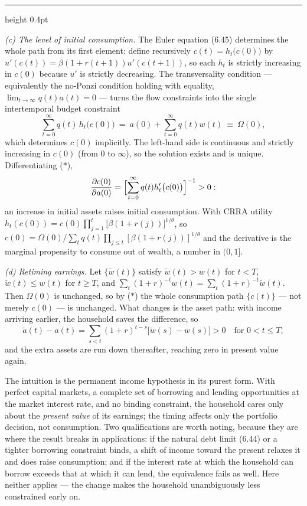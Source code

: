 \documentclass[11pt,letterpaper,reqno]{amsart}
\makeatletter
\newcommand{\as@head}[3]{%
  \par\addvspace{1.6ex}\penalty-200\relax
  \phantomsection
  \addcontentsline{toc}{subsection}{#1 #2\texorpdfstring{\ifx\relax#3\relax\else\quad #3\fi}{}}%
  {\color{RuleGrey}\hrule height 0.4pt}%
  \nobreak\vspace{0.8ex}\nobreak
  \noindent{\bfseries #1 #2}%
  \ifx\relax#3\relax\else\quad{\bfseries\itshape #3}\fi
  \par\nobreak\vspace{0.4ex}\nobreak
  \as@beginstatement
}
\newcommand{\as@beginstatement}{\begingroup\itshape\ignorespaces}
\newenvironment{aex}[2]{\as@head{Exercise}{#1}{#2}}{\par\addvspace{1.2ex}}
\newcommand{\bk}[1]{\textup{\textsc{#1}}}
\renewcommand{\as@beginstatement}{\ignorespaces}
\makeatother
\begin{document}
\begin{aex}{6.13}{}
\emph{(c) The level of initial consumption.}  The Euler equation \bk{(6.45)} determines the whole path from
its first element: define recursively $c(t)=h_t\bigl(c(0)\bigr)$ by
$u'(c(t))=\beta(1+r(t+1))u'(c(t+1))$, so each $h_t$ is strictly increasing in $c(0)$ because $u'$ is
strictly decreasing.  The transversality condition --- equivalently the no-Ponzi condition holding with
equality, $\lim_{t\to\infty}q(t)a(t)=0$ --- turns the flow constraints into the single intertemporal budget
constraint
\[
\sum_{t=0}^{\infty}q(t)\,h_t\bigl(c(0)\bigr)\ =\ a(0)+\sum_{t=0}^{\infty}q(t)w(t)\ \equiv\ \Omega(0),
\tag{$*$}
\]
which determines $c(0)$ implicitly.  The left-hand side is continuous and strictly increasing in $c(0)$
(from $0$ to $\infty$), so the solution exists and is unique.  Differentiating ($*$),
\[
\frac{\partial c(0)}{\partial a(0)}=\Bigl[\sum_{t=0}^{\infty}q(t)h_t'\bigl(c(0)\bigr)\Bigr]^{-1}>0 :
\]
an increase in initial assets raises initial consumption.  With CRRA utility
$h_t(c(0))=c(0)\prod_{j=1}^{t}\bigl[\beta(1+r(j))\bigr]^{1/\theta}$, so
$c(0)=\Omega(0)/\sum_tq(t)\prod_{j\le t}[\beta(1+r(j))]^{1/\theta}$ and the derivative is the marginal
propensity to consume out of wealth, a number in $(0,1]$.

\emph{(d) Retiming earnings.}  Let $\{\tilde w(t)\}$ satisfy $\tilde w(t)>w(t)$ for $t<T$,
$\tilde w(t)\le w(t)$ for $t\ge T$, and $\sum_t(1+r)^{-t}w(t)=\sum_t(1+r)^{-t}\tilde w(t)$.  Then
$\Omega(0)$ is unchanged, so by ($*$) the whole consumption path
$\{c(t)\}$ --- not merely $c(0)$ --- is unchanged.  What changes is the asset path: with income arriving
earlier, the household saves the difference, so
\[
\tilde a(t)-a(t)=\sum_{s<t}(1+r)^{t-s}\bigl[\tilde w(s)-w(s)\bigr]>0
\quad\text{for }0<t\le T,
\]
and the extra assets are run down thereafter, reaching zero in present value again.

The intuition is the permanent income hypothesis in its purest form.  With perfect capital markets, a
complete set of borrowing and lending opportunities at the market interest rate, and no binding constraint,
the household cares only about the \emph{present value} of its earnings; the timing affects only the
portfolio decision, not consumption.  Two qualifications are worth noting, because they are where the
result breaks in applications: if the natural debt limit \bk{(6.44)} or a tighter borrowing constraint
binds, a shift of income toward the present relaxes it and does raise consumption; and if the interest rate
at which the household can borrow exceeds that at which it can lend, the equivalence fails as well.  Here
neither applies --- the change makes the household unambiguously less constrained early on.
\end{aex}
\end{document}
